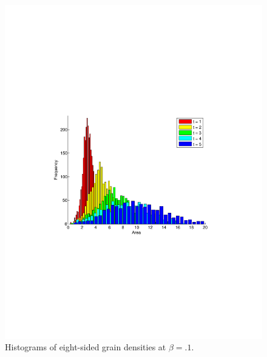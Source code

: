 \clearpage{}
\begin{figure}
\includegraphics[width=\textwidth]{histbetatenthtier8.pdf}
\vspace{-130pt}
\caption{Histograms of eight-sided grain densities at $\beta = .1$.}
\end{figure}

